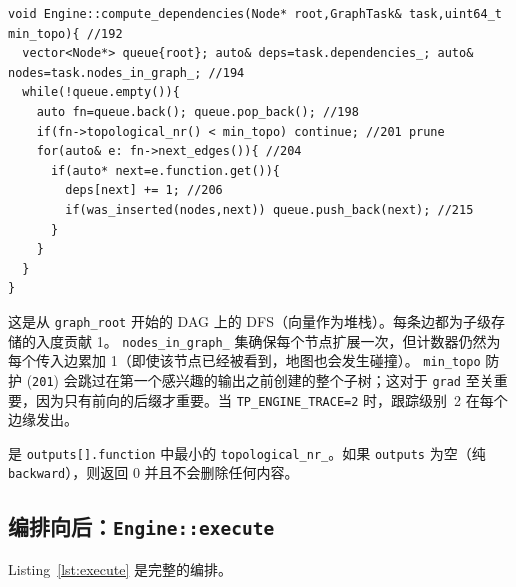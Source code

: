 \begin{lstlisting}[caption={BFS in-degree.}, label=lst:computedep]
void Engine::compute_dependencies(Node* root,GraphTask& task,uint64_t min_topo){ //192
  vector<Node*> queue{root}; auto& deps=task.dependencies_; auto& nodes=task.nodes_in_graph_; //194
  while(!queue.empty()){
    auto fn=queue.back(); queue.pop_back(); //198
    if(fn->topological_nr() < min_topo) continue; //201 prune
    for(auto& e: fn->next_edges()){ //204
      if(auto* next=e.function.get()){
        deps[next] += 1; //206
        if(was_inserted(nodes,next)) queue.push_back(next); //215
      }
    }
  }
}
\end{lstlisting}

这是从 \texttt{graph\_root} 开始的 DAG 上的 DFS（向量作为堆栈）。每条边都为子级存储的入度贡献 1。 \texttt{nodes\_in\_graph\_} 集确保每个节点扩展一次，但计数器仍然为每个传入边累加 1（即使该节点已经被看到，地图也会发生碰撞）。 \texttt{min\_topo} 防护 (\texttt{201}) 会跳过在第一个感兴趣的输出之前创建的整个子树；这对于 \texttt{grad} 至关重要，因为只有前向的后缀才重要。当 \texttt{TP\_ENGINE\_TRACE=2} 时，跟踪级别~2 在每个边缘发出。

是 \texttt{outputs[].function} 中最小的 \texttt{topological\_nr\_}。如果 \texttt{outputs} 为空（纯 \texttt{backward}），则返回 0 并且不会删除任何内容。

\subsection{编排向后：\texttt{Engine::execute}}
\label{subsec:execute}

Listing~\ref{lst:execute} 是完整的编排。

